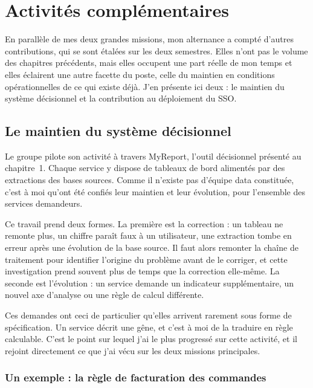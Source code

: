 
\chapter{Activités complémentaires}
\minitoc
\newpage

En parallèle de mes deux grandes missions, mon alternance a compté d'autres contributions, qui
se sont étalées sur les deux semestres. Elles n'ont pas le volume des chapitres précédents, mais
elles occupent une part réelle de mon temps et elles éclairent une autre facette du poste, celle
du maintien en conditions opérationnelles de ce qui existe déjà. J'en présente ici deux : le
maintien du système décisionnel et la contribution au déploiement du SSO.

\section{Le maintien du système décisionnel}

Le groupe pilote son activité à travers MyReport, l'outil décisionnel présenté au chapitre~1.
Chaque service y dispose de tableaux de bord alimentés par des extractions des bases sources.
Comme il n'existe pas d'équipe data constituée, c'est à moi qu'ont été confiés leur maintien et
leur évolution, pour l'ensemble des services demandeurs.

Ce travail prend deux formes. La première est la correction : un tableau ne remonte plus, un
chiffre paraît faux à un utilisateur, une extraction tombe en erreur après une évolution de la
base source. Il faut alors remonter la chaîne de traitement pour identifier l'origine du
problème avant de le corriger, et cette investigation prend souvent plus de temps que la
correction elle-même. La seconde est l'évolution : un service demande un indicateur
supplémentaire, un nouvel axe d'analyse ou une règle de calcul différente.

Ces demandes ont ceci de particulier qu'elles arrivent rarement sous forme de spécification. Un
service décrit une gêne, et c'est à moi de la traduire en règle calculable. C'est le point sur
lequel j'ai le plus progressé sur cette activité, et il rejoint directement ce que j'ai vécu sur
les deux missions principales.

\subsection{Un exemple : la règle de facturation des commandes}

